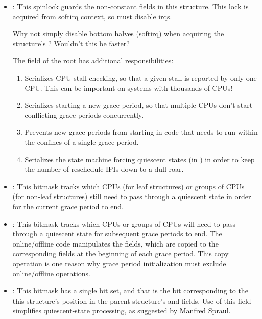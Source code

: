 \begin{itemize}
\item	{}:
	This spinlock guards the non-constant fields in this structure.
	This lock is acquired from softirq context, so must disable
	irqs.

\QuickQuiz{}
	Why not simply disable bottom halves (softirq) when acquiring
	the  structure's ?
	Wouldn't this be faster?
 \QuickQuizEnd

	The  field of the root  has additional
	responsibilities:
	\begin{enumerate}
	\item	Serializes CPU-stall checking, so that a given stall
		is reported by only one CPU.
		This can be important on systems with thousands of
		CPUs!
	\item	Serializes starting a new grace period, so that
		multiple CPUs don't start conflicting grace periods
		concurrently.
	\item	Prevents new grace periods from starting in code that
		needs to run within the confines of a single grace period.
	\item	Serializes the state machine forcing quiescent states
		(in ) in order to
		keep the number of reschedule IPIs down to a dull
		roar.
	\end{enumerate}
\item	{}:
	This bitmask tracks which CPUs (for leaf  structures)
	or groups of CPUs (for non-leaf  structures)
	still need to pass through a quiescent state in order for the
	current grace period to end.
\item	{}:
	This bitmask tracks which CPUs or groups of CPUs will need to
	pass through a quiescent state for subsequent grace periods
	to end.
	The online/offline code manipulates the  fields,
	which are copied to the corresponding  fields at
	the beginning of each grace period.
	This copy operation is one reason why grace period initialization
	must exclude online/offline operations.
\item	{}:
	This bitmask has a single bit set, and that is the bit corresponding
	to the this  structure's position in the parent
	 structure's  and 
	fields.
	Use of this field simplifies quiescent-state processing,
	as suggested by Manfred Spraul.


\end{itemize}

